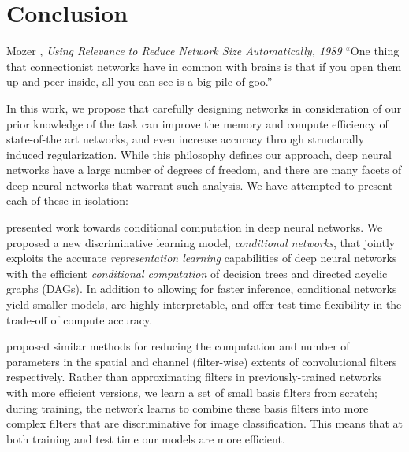\documentclass[thesis]{subfiles}
\begin{document}

\chapter{Conclusion}
\label{conclusion}
\begin{chapquote}{Mozer \etal, \textit{Using Relevance to Reduce Network Size Automatically, 1989}}
    ``One thing that connectionist networks have in common with brains is that if you open them up and peer inside, all you can see is a big pile of goo.''
\end{chapquote}
In this work, we propose that carefully designing networks in consideration of our prior knowledge of the task can improve the memory and compute efficiency of state-of-the art networks, and even increase accuracy through structurally induced regularization. While this philosophy defines our approach, deep neural networks have a large number of degrees of freedom, and there are many facets of deep neural networks that warrant such analysis. We have attempted to present each of these in isolation:

 presented work towards conditional computation in deep neural networks. We proposed a new discriminative learning model, \emph{conditional networks}, 
that jointly exploits the accurate \emph{representation learning} capabilities of deep neural networks with the efficient \emph{conditional computation} of decision trees and directed acyclic graphs (DAGs). In addition to allowing for faster inference, conditional networks yield smaller models, are highly interpretable, and offer test-time flexibility in the trade-off of compute \vs accuracy.

 proposed similar methods for reducing the computation and number of parameters in the spatial and channel (filter-wise) extents of convolutional filters respectively. Rather than approximating filters in previously-trained networks with more efficient versions, we learn a set of small basis filters from scratch; during training, the network learns to combine these basis filters into more complex filters that are discriminative for image classification. This means that at both training and test time our models are more efficient.
\end{document}
